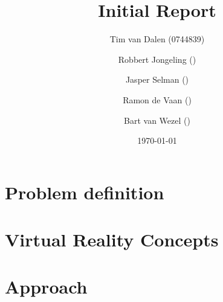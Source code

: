 \documentclass[a4paper,11pt]{article}
\title{
	Initial Report
}
\author{
	Tim van Dalen (0744839)
	\and
	Robbert Jongeling ()
	\and
	Jasper Selman ()
	\and
	Ramon de Vaan ()
	\and
	Bart van Wezel ()
}
\date{\today}
\begin{document}
	\maketitle
	
	\begin{abstract}
		
	\end{abstract}
	
	\section{Problem definition}
	\label{sec:problem}
	
	
	\section{Virtual Reality Concepts}
	\label{sec:vr}
	
	
	\section{Approach}
	\label{sec:approach}
	
	
	
\end{document}
